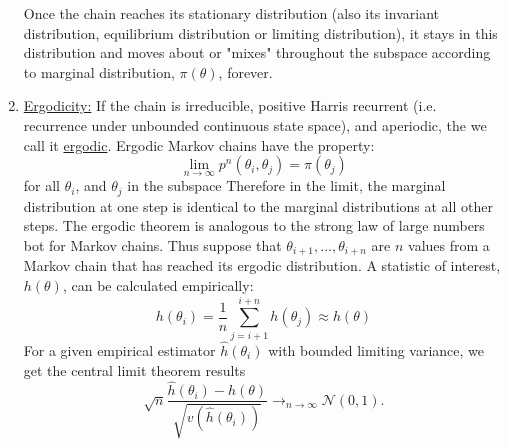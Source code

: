\documentclass[lecture,12pt,]{pcms-l}
\numberwithin{section}{chapter}
\numberwithin{equation}{chapter}
\theoremstyle{plain}
\theoremstyle{definition}
\theoremstyle{definition}
\begin{document}
\begin{enumerate}
Once the chain reaches its stationary distribution (also its invariant distribution, equilibrium distribution or limiting distribution), it stays in this distribution and moves about or "mixes" throughout the subspace according to marginal distribution, $\pi(\theta)$, forever.
\item \underline{Ergodicity:} If the chain is irreducible, positive Harris recurrent (i.e. recurrence under unbounded continuous state space), and aperiodic, the we call it \underline{ergodic}. Ergodic Markov chains have the property:
\begin{equation}
\lim_{n\rightarrow \infty} p^n(\theta_i,\theta_j)=\pi(\theta_j)
\end{equation}
for all $\theta_i$, and $\theta_j$ in the subspace Therefore in the limit, the marginal distribution at one step is identical to the marginal distributions at all other steps. The ergodic theorem is analogous to the strong law of large numbers bot for Markov chains. Thus suppose that $\theta_{i+1},...,\theta_{i+n}$ are $n$ values from a Markov chain that has reached its ergodic distribution. A statistic of interest, $h(\theta)$, can be calculated empirically:
\begin{equation}
h(\theta_i)=\frac{1}{n}\sum_{j=i+1}^{i+n}h(\theta_j) \approx h(\theta)
\end{equation}
For a given empirical estimator $\hat{h}(\theta_i)$ with bounded limiting variance, we get the central limit theorem results 
\begin{equation}
\sqrt{n}\frac{\hat{h}(\theta_i)-h(\theta)}{\sqrt{v(\hat{h}(\theta_i))}}\rightarrow_{n \rightarrow \infty} \mathcal{N}(0,1).
\end{equation}
\end{enumerate}
\end{document}

